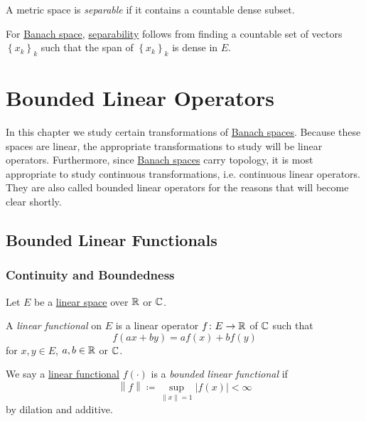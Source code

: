 \begin{definition}[Separable]\label{def:separable}
	A metric space is \emph{separable} if it contains a countable dense subset.
\end{definition}

\begin{remark}
	For \hyperref[def:Banach-space]{Banach space}, \hyperref[def:separable]{separability} follows from finding a countable set of vectors \(\left\{ x_{k}\right\}_k\) such that the span of \(\left\{ x_{k}\right\}_k\) is dense in \(E\).
\end{remark}

\chapter{Bounded Linear Operators}

In this chapter we study certain transformations of \hyperref[def:Banach-space]{Banach spaces}. Because these spaces are linear, the appropriate transformations to study will be linear operators. Furthermore, since \hyperref[def:Banach-space]{Banach spaces} carry topology, it is most appropriate to study continuous transformations, i.e. continuous linear operators. They are also called bounded linear operators for the reasons that will become clear shortly.

\section{Bounded Linear Functionals}
\subsection{Continuity and Boundedness}
\begin{definition*}
	Let \(E\) be a \hyperref[def:linear-vector-space]{linear space} over \(\mathbb{\MakeUppercase{r}} \) or \(\mathbb{\MakeUppercase{c}} \).
	\begin{definition}\label{def:linear-functional}
		A \emph{linear functional} on \(E\) is a linear operator \(f\colon E\to \mathbb{\MakeUppercase{r}} \) of \(\mathbb{\MakeUppercase{c}} \) such that
		\[
			f(ax + by) = af(x) + bf(y)
		\]
		for \(x, y\in E\), \(a, b\in \mathbb{\MakeUppercase{r}} \) or \(\mathbb{\MakeUppercase{c}} \).
	\end{definition}
	\begin{definition}\label{def:bounded-linear-functional}
		We say a \hyperref[def:linear-functional]{linear functional} \(f(\cdot)\) is a \emph{bounded linear functional} if
		\[
			\left\lVert f\right\rVert \coloneqq \sup _{\left\lVert x\right\rVert = 1}\left\vert f(x) \right\vert  < \infty
		\]
		by dilation and additive.
	\end{definition}
\end{definition*}

